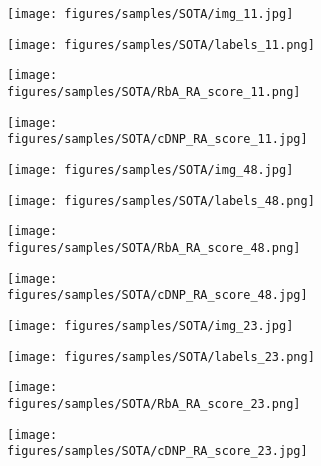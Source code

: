 \documentclass[10pt,twocolumn,letterpaper]{article}
\begin{document}
\begin{figure*}[h!]
{    }
    \label{fig:quali_cnxt_vit}
\end{figure*} \begin{figure}[h!]
    \centering
    \begin{subfigure}[b]{0.10\textwidth}
        \centering
        \texttt{[image: figures/samples/SOTA/img\_11.jpg]}
    \end{subfigure}
    \begin{subfigure}[b]{0.10\textwidth}
        \centering
        \texttt{[image: figures/samples/SOTA/labels\_11.png]}
    \end{subfigure}
    \begin{subfigure}[b]{0.10\textwidth}
        \centering
        \texttt{[image: figures/samples/SOTA/RbA\_RA\_score\_11.png]}
    \end{subfigure}
    \begin{subfigure}[b]{0.10\textwidth}
        \centering
        \texttt{[image: figures/samples/SOTA/cDNP\_RA\_score\_11.jpg]}
    \end{subfigure}
    
    \begin{subfigure}[b]{0.10\textwidth}
        \centering
        \texttt{[image: figures/samples/SOTA/img\_48.jpg]}
    \end{subfigure}
    \begin{subfigure}[b]{0.10\textwidth}
        \centering
        \texttt{[image: figures/samples/SOTA/labels\_48.png]}
    \end{subfigure}
    \begin{subfigure}[b]{0.10\textwidth}
        \centering
        \texttt{[image: figures/samples/SOTA/RbA\_RA\_score\_48.png]}
    \end{subfigure}
    \begin{subfigure}[b]{0.10\textwidth}
        \centering
        \texttt{[image: figures/samples/SOTA/cDNP\_RA\_score\_48.jpg]}
    \end{subfigure}
    
    \begin{subfigure}[b]{0.10\textwidth}
        \centering
        \texttt{[image: figures/samples/SOTA/img\_23.jpg]}
    \end{subfigure}
    \begin{subfigure}[b]{0.10\textwidth}
        \centering
        \texttt{[image: figures/samples/SOTA/labels\_23.png]}
    \end{subfigure}
    \begin{subfigure}[b]{0.10\textwidth}
        \centering
        \texttt{[image: figures/samples/SOTA/RbA\_RA\_score\_23.png]}
    \end{subfigure}
    \begin{subfigure}[b]{0.10\textwidth}
        \centering
        \texttt{[image: figures/samples/SOTA/cDNP\_RA\_score\_23.jpg]}
    \end{subfigure}
    

\end{figure}
\end{document}
